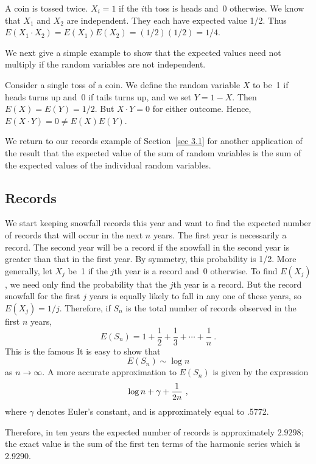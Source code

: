 \begin{example}\label{exam 6.3} A coin is tossed twice.  $X_i = 1$ if the $i$th toss
is heads and~0 otherwise.  We know that $X_1$ and $X_2$ are independent.  They each
have expected value 1/2.  Thus $E(X_1 \cdot X_2) = E(X_1) E(X_2) = (1/2)(1/2) = 1/4$.
\end{example}

We next give a simple example to show that the expected values need not multiply if
the random variables are not independent.  

\begin{example}\label{exam 6.4} Consider a single toss of a coin.  We define the
random variable $X$ to be~1 if heads turns up and~0 if tails turns up, and we set $Y
= 1 - X$.  Then $E(X) = E(Y) = 1/2$.  But $X \cdot Y = 0$ for either outcome.  Hence,
$E(X \cdot Y) = 0 \ne E(X) E(Y)$.
\end{example}

We return to our records example of Section~\ref{sec 3.1} for another application of
the result that the expected value of the sum of random variables is the sum of the
expected values of the individual random variables.

\subsection*{Records}

\begin{example}\label{exam 6.5} We start keeping snowfall records this year and want
to find the expected number of records that will occur in the next $n$ years.  The
first year is necessarily a record.  The second year will be a record if the snowfall
in the second year is greater than that in the first year.  By symmetry, this
probability is 1/2.  More generally, let $X_j$ be~1 if the $j$th year is a record
and~0 otherwise.  To find $E(X_j)$, we need only find the probability that the $j$th
year is a record.  But the record snowfall for the first $j$ years is equally likely
to fall in any one of these years, so $E(X_j) = 1/j$.  Therefore, if $S_n$ is the
total number of records observed in the first $n$ years,
$$ E(S_n) = 1 + \frac 12 + \frac 13 +\cdots+ \frac 1n\ .
$$ This is the famous    It is easy to show that
$$ E(S_n) \sim \log n
$$ as $n \rightarrow \infty$.  A more accurate approximation to $E(S_n)$ is given by the expression
$$\log n + \gamma + {1\over {2n}}\ ,$$
where $\gamma$ denotes Euler's constant, and is approximately equal to .5772.

Therefore, in ten years the expected number of records is approximately $2.9298$; the exact value is the sum of the first ten terms of the harmonic series which
is 2.9290.  
\end{example}


